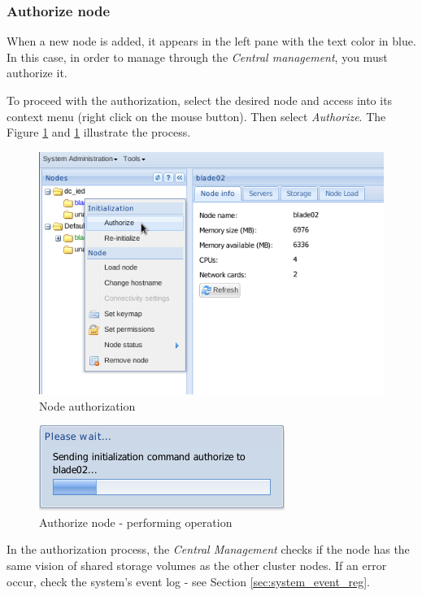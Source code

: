 {\subsubsection{Authorize node}
When a new node is added, it appears in the left pane with the text color in blue. In this case, in order to manage through the \textit{Central management}, you must authorize it.

To proceed with the authorization, select the desired node and access into its context menu (right click on the mouse button). Then select \textit{Authorize}. The Figure \ref{fig:cluster-auth} and \ref{fig:cluster-auth} illustrate the process.

\begin{figure}[H]
        \begin{center}
        \includegraphics[scale=0.6]{screenshots/cluster-auth.png}
        \caption{Node authorization}
        \label{fig:cluster-auth}
        \end{center}
\end{figure}

\begin{figure}[H]
        \begin{center}
        \includegraphics[scale=0.6]{screenshots/cluster-auth1.png}
        \caption{Authorize node - performing operation}
        \label{fig:cluster-auth1}
        \end{center}
\end{figure}
In the authorization process, the \textit{Central Management} checks if the node has the same vision of shared storage volumes as the other cluster nodes. If an error occur, check the system's event log - see Section \ref{sec:system_event_reg}.
}%

